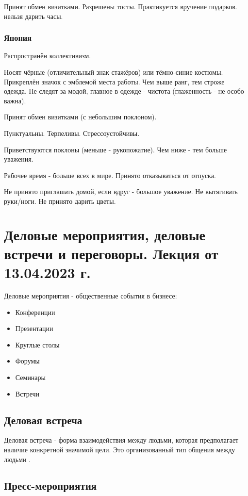 Принят обмен визитками. Разрешены тосты. Практикуется вручение подарков. нельзя дарить часы.

\subsubsection{Япония}

Распространён коллективизм.

Носят чёрные (отличительный знак стажёров) или тёмно-синие костюмы.
Прикреплён значок с эмблемой места работы. Чем выше ранг, тем строже одежда.
Не следят за модой, главное в одежде - чистота (глаженность - не особо важна).

Принят обмен визитками (с небольшим поклоном).

Пунктуальны. Терпеливы. Стрессоустойчивы.

Приветствуются поклоны (меньше - рукопожатие). Чем ниже - тем больше уважения.

Рабочее время - больше всех в мире. Принято отказываться от отпуска.

Не принято приглашать домой, если вдруг - большое уважение. Не вытягивать руки/ноги. Не принято дарить цветы.

\section{Деловые мероприятия, деловые встречи и переговоры. Лекция от 13.04.2023 г.}

Деловые мероприятия - общественные события в бизнесе:
\begin{itemize}
    \item Конференции
    \item Презентации
    \item Круглые столы
    \item Форумы
    \item Семинары
    \item Встречи
\end{itemize}

\subsection{Деловая встреча}

Деловая встреча - форма взаимодействия между людьми, которая предполагает наличие конкретной значимой цели. Это организованный тип общения между людьми \missed{}.

\subsection{Пресс-мероприятия}

